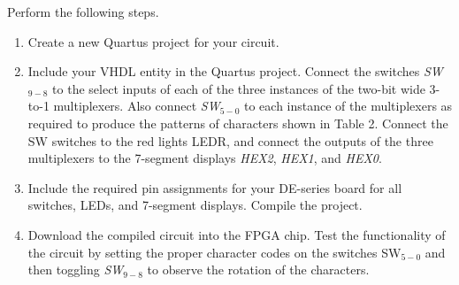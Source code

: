 \documentclass[epsfig,10pt,fullpage]{article}
\begin{document}
Perform the following steps.
\begin{enumerate}
\item Create a new Quartus  project for your circuit.
\item Include your VHDL entity in the Quartus  project. Connect the switches 
{\it SW}$_{9-8}$ to the select inputs of each of the three instances of the two-bit 
wide 3-to-1 multiplexers. Also connect {\it SW}$_{5-0}$ to each instance of the
multiplexers as required to produce the patterns of characters shown in Table 2.
Connect the SW switches to the red lights LEDR, and connect the outputs of the three 
multiplexers to the 7-segment displays {\it HEX2}, {\it HEX1}, and {\it HEX0}.
\item Include the required pin assignments for your DE-series board for all switches, LEDs, 
and 7-segment displays. Compile the project.
\item Download the compiled circuit into the FPGA chip. Test the functionality of the 
circuit by setting the proper character codes on the switches SW$_{5-0}$ and then 
toggling {\it SW}$_{9-8}$ to observe the rotation of the characters.
\end{enumerate}
\end{document}
